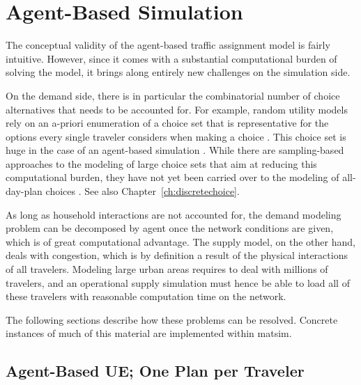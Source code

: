 \section{Agent-Based Simulation}
\label{sec:agent-based-simul}

The conceptual validity of the agent-based traffic assignment model is fairly intuitive. 
However, since it comes with a substantial computational burden of solving the model, 
it brings along entirely new challenges on the simulation side.

On the demand side, there is in particular the combinatorial number of choice alternatives that 
needs to be accounted for. For example, random utility models rely on an a-priori enumeration 
of a choice set that is representative for the options every single traveler considers when 
making a choice \citep[][]{ben-akiva-1985}. This choice set is huge in the case of an agent-based 
simulation \citep[][]{bowman-1998}. While there are sampling-based approaches to the modeling 
of large choice sets that aim at reducing this computational burden, they have not yet been 
carried over to the modeling of all-day-plan choices \citep[][]{ben-akiva-1985, frejinger-2009, 
floetteroed-2012b}.
See also Chapter~\ref{ch:discretechoice}.

As long as household interactions are not accounted for, the demand modeling problem can be 
decomposed by agent once the network conditions are given, which is of great computational advantage. 
The supply model, on the other hand, deals with congestion, which is by definition a result of the 
physical interactions of all travelers. Modeling large urban areas requires to deal with millions of travelers, 
and an operational supply simulation must hence be able to load all of these travelers with 
reasonable computation time on the network. 

The following sections describe how these problems can be resolved. Concrete instances
of much of this material are implemented within \gls{matsim}.


\subsection{Agent-Based UE; One Plan per Traveler}
\label{sec:agent-based-ue}

